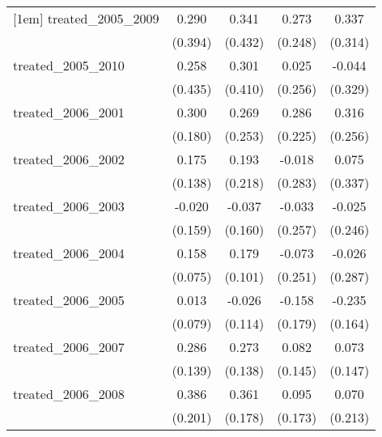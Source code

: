 {\begin{tabular}{l*{4}{c}}
[1em]
treated\_2005\_2009&       0.290         &       0.341         &       0.273         &       0.337         \\
            &     (0.394)         &     (0.432)         &     (0.248)         &     (0.314)         \\
[1em]
treated\_2005\_2010&       0.258         &       0.301         &       0.025         &      -0.044         \\
            &     (0.435)         &     (0.410)         &     (0.256)         &     (0.329)         \\
[1em]
treated\_2006\_2001&       0.300         &       0.269         &       0.286         &       0.316         \\
            &     (0.180)         &     (0.253)         &     (0.225)         &     (0.256)         \\
[1em]
treated\_2006\_2002&       0.175         &       0.193         &      -0.018         &       0.075         \\
            &     (0.138)         &     (0.218)         &     (0.283)         &     (0.337)         \\
[1em]
treated\_2006\_2003&      -0.020         &      -0.037         &      -0.033         &      -0.025         \\
            &     (0.159)         &     (0.160)         &     (0.257)         &     (0.246)         \\
[1em]
treated\_2006\_2004&       0.158\sym{*}  &       0.179         &      -0.073         &      -0.026         \\
            &     (0.075)         &     (0.101)         &     (0.251)         &     (0.287)         \\
[1em]
treated\_2006\_2005&       0.013         &      -0.026         &      -0.158         &      -0.235         \\
            &     (0.079)         &     (0.114)         &     (0.179)         &     (0.164)         \\
[1em]
treated\_2006\_2007&       0.286\sym{*}  &       0.273\sym{*}  &       0.082         &       0.073         \\
            &     (0.139)         &     (0.138)         &     (0.145)         &     (0.147)         \\
[1em]
treated\_2006\_2008&       0.386         &       0.361\sym{*}  &       0.095         &       0.070         \\
            &     (0.201)         &     (0.178)         &     (0.173)         &     (0.213)         \\

\end{tabular}}
